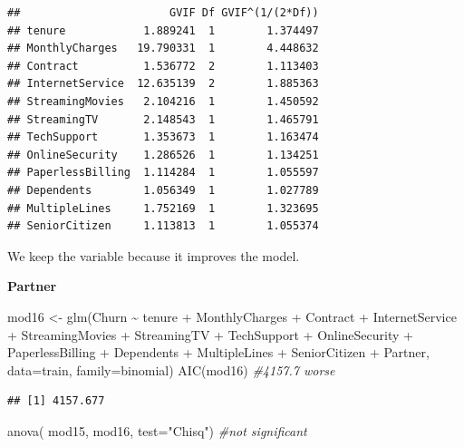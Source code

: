 \documentclass[
  twoside]{article}
\newenvironment{Shaded}{\begin{snugshade}}{\end{snugshade}}
\newcommand{\AttributeTok}[1]{\textcolor[rgb]{0.77,0.63,0.00}{#1}}
\newcommand{\CommentTok}[1]{\textcolor[rgb]{0.56,0.35,0.01}{\textit{#1}}}
\newcommand{\FunctionTok}[1]{\textcolor[rgb]{0.00,0.00,0.00}{#1}}
\newcommand{\NormalTok}[1]{#1}
\newcommand{\OtherTok}[1]{\textcolor[rgb]{0.56,0.35,0.01}{#1}}
\newcommand{\SpecialCharTok}[1]{\textcolor[rgb]{0.00,0.00,0.00}{#1}}
\newcommand{\StringTok}[1]{\textcolor[rgb]{0.31,0.60,0.02}{#1}}
\begin{document}
\begin{verbatim}
##                       GVIF Df GVIF^(1/(2*Df))
## tenure            1.889241  1        1.374497
## MonthlyCharges   19.790331  1        4.448632
## Contract          1.536772  2        1.113403
## InternetService  12.635139  2        1.885363
## StreamingMovies   2.104216  1        1.450592
## StreamingTV       2.148543  1        1.465791
## TechSupport       1.353673  1        1.163474
## OnlineSecurity    1.286526  1        1.134251
## PaperlessBilling  1.114284  1        1.055597
## Dependents        1.056349  1        1.027789
## MultipleLines     1.752169  1        1.323695
## SeniorCitizen     1.113813  1        1.055374
\end{verbatim}

We keep the variable because it improves the model.

\textbf{Partner}

\begin{Shaded}
\begin{Highlighting}[]
\NormalTok{mod16 }\OtherTok{\textless{}{-}} \FunctionTok{glm}\NormalTok{(Churn }\SpecialCharTok{\textasciitilde{}}\NormalTok{ tenure }\SpecialCharTok{+}\NormalTok{ MonthlyCharges }\SpecialCharTok{+}\NormalTok{ Contract }\SpecialCharTok{+}\NormalTok{ InternetService }\SpecialCharTok{+} 
\NormalTok{               StreamingMovies }\SpecialCharTok{+}\NormalTok{ StreamingTV }\SpecialCharTok{+}\NormalTok{ TechSupport }\SpecialCharTok{+}\NormalTok{ OnlineSecurity }\SpecialCharTok{+} 
\NormalTok{               PaperlessBilling }\SpecialCharTok{+}\NormalTok{ Dependents }\SpecialCharTok{+}\NormalTok{ MultipleLines }\SpecialCharTok{+}\NormalTok{ SeniorCitizen }\SpecialCharTok{+} 
\NormalTok{               Partner, }\AttributeTok{data=}\NormalTok{train, }\AttributeTok{family=}\NormalTok{binomial)}
\FunctionTok{AIC}\NormalTok{(mod16) }\CommentTok{\#4157.7 worse}
\end{Highlighting}
\end{Shaded}

\begin{verbatim}
## [1] 4157.677
\end{verbatim}

\begin{Shaded}
\begin{Highlighting}[]
\FunctionTok{anova}\NormalTok{( mod15, mod16,  }\AttributeTok{test=}\StringTok{"Chisq"}\NormalTok{) }\CommentTok{\#not significant}
\end{Highlighting}
\end{Shaded}
\end{document}
